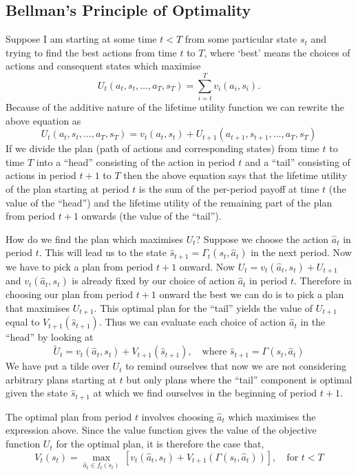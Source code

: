 \documentclass[12pt,reqno]{amsart}
\begin{document}
\subsection{Bellman's Principle of Optimality} 
Suppose I am starting at some time $t<T$ from some particular state $s_t$ and
trying to find the best actions from time $t$ to $T$, where `best'
means the choices of actions and consequent states which maximise 
\[U_t(a_t,s_t,\ldots,a_T,s_T)=\sum_{i=t}^T v_i(a_i,s_i).\] 
Because of the additive nature of the lifetime utility function we can
rewrite the above equation as
\[U_t(a_t,s_t,\ldots,a_T,s_T)=v_t(a_t,s_t)+U_{t+1}(a_{t+1},s_{t+1},\ldots,a_T,s_T)\]
If we divide the plan (path of actions and corresponding states) from
time $t$ to time $T$ into a ``head'' consisting of the action in
period $t$ and a ``tail'' consisting of actions in period $t+1$ to $T$
then the above equation says that the lifetime utility of the plan
starting at period $t$ is the sum of the per-period payoff at time $t$
(the value of the ``head'') and the lifetime utility of the remaining
part of the plan from period $t+1$ onwards (the value of the
``tail'').

How do we find the plan which maximises $U_t$? Suppose we choose the
action $\hat a_t$ in period $t$. This will lead us to the state $\hat
s_{t+1}=\Gamma_t(s_t,\hat a_t)$ in the next period. Now we have to
pick a plan from period $t+1$ onward. Now $U_t=v_t(\hat
a_t,s_t)+U_{t+1}$ and $v_t(\hat a_t,s_t)$ is already fixed by our
choice of action $\hat a_t$ in period $t$. Therefore in choosing our
plan from period $t+1$ onward the best we can do is to pick a plan
that maximises $U_{t+1}$. This optimal plan for the ``tail'' yields
the value of $U_{t+1}$ equal to $V_{t+1}(\hat s_{t+1})$. Thus we can
evaluate each choice of action $\hat a_t$ in the ``head'' by looking
at 
\[\tilde U_t=v_t(\hat a_t,s_t)+V_{t+1}(\hat s_{t+1}),\quad 
\text {where $\hat s_{t+1}=\Gamma(s_t,\hat a_t)$}\]
We have put a tilde over $U_t$ to remind ourselves that now we are not
considering arbitrary plans starting at $t$ but only plans where the
``tail'' component is optimal given the state $\hat s_{t+1}$ at which
we find ourselves in the beginning of period $t+1$. 

The optimal plan from period $t$ involves choosing $\hat a_t$ which
maximises the expression above. Since the value function gives the
value of the objective function $U_t$ for the optimal plan, it is
therefore the case that,
\begin{equation}\label{dp:the-bellman}
V_t(s_t)=\max_{\hat a_t \in f_t(s_t)}\,[v_t(\hat
  a_t,s_t)+V_{t+1}(\Gamma(s_t,\hat a_t))], \quad \text{for $t<T$}
\end{equation}
\end{document}

